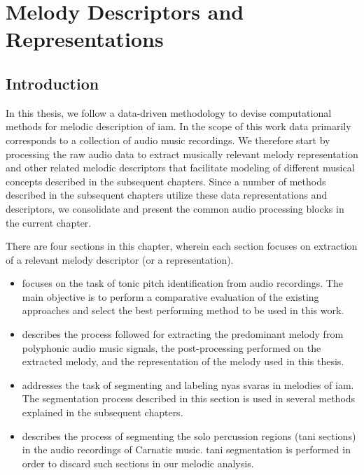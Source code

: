 
\chapter{Melody Descriptors and Representations}
\label{chap:data_preprocessing}

\section{Introduction}
\label{sec:data_preprocessing_intro}

In this thesis, we follow a data-driven methodology to devise computational methods for melodic description of \gls{iam}.  In the scope of this work data primarily corresponds to a collection of audio music recordings. We therefore start by processing the raw audio data to extract musically relevant melody representation and other related melodic descriptors that facilitate modeling of different musical concepts described in the subsequent chapters. Since a number of methods described in the subsequent chapters utilize these data representations and descriptors, we consolidate and present the common audio processing blocks in the current chapter.

There are four sections in this chapter, wherein each section focuses on extraction of a relevant melody descriptor (or a representation).
\begin{itemize}
	\item {} focuses on the task of tonic pitch identification from audio recordings. The main objective is to perform a comparative evaluation of the existing approaches and select the best performing method to be used in this work.
	\item {} describes the process followed for extracting the predominant melody from polyphonic audio music signals, the post-processing performed on the extracted melody, and the representation of the melody used in this thesis.
	\item {} addresses the task of segmenting and labeling \gls{nyas} \glspl{svara} in melodies of \gls{iam}. The segmentation process described in this section is used in several methods explained in the subsequent chapters. 
	\item {} describes the process of segmenting the solo percussion regions (\Gls{tani} sections) in the audio recordings of Carnatic music. \Gls{tani} segmentation is performed in order to discard such sections in our melodic analysis.  
\end{itemize}


